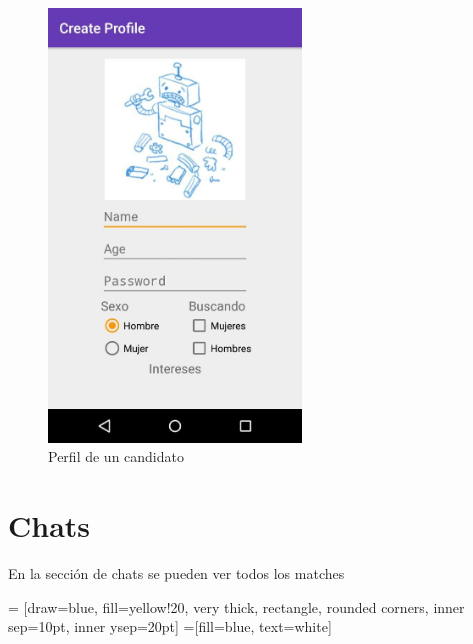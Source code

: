 \documentclass[10pt,letterpaper,extrafontsizes]{memoir}
\begin{document}
\begin{figure}[H]
    \centering
\includegraphics[width=0.6\textwidth]{graficos/capturas/i}
    \caption{Perfil de un candidato}
    \label{fig:perfmatch}
\end{figure}

\chapter{Chats}\label{cap:chat}

En la sección de chats se pueden ver todos los matches 

\begin{center}
 = [draw=blue, fill=yellow!20, very thick,
    rectangle, rounded corners, inner sep=10pt, inner ysep=20pt]
 =[fill=blue, text=white]
\end{center}
%
\end{document}
